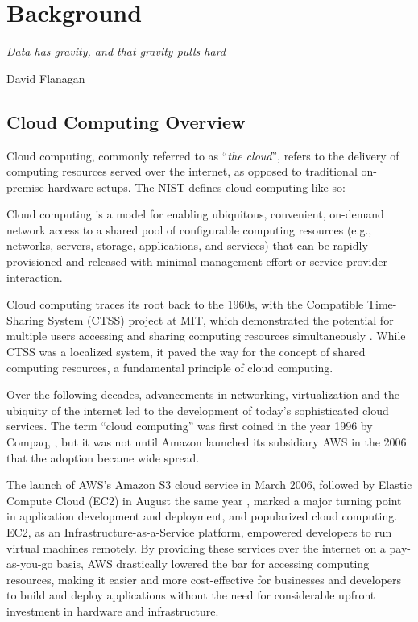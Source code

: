 \documentclass[
  table]{report}
\begin{document}
\newpage

\chapter{Background}
\label{chap:background}

\epigraph{\itshape 
Data has gravity, and that gravity pulls hard
}{David Flanagan}

\section{Cloud Computing Overview}
\label{sect:cloud-overview}

Cloud computing, commonly referred to as ``\emph{the cloud}'', refers to
the delivery of computing resources served over the internet, as opposed
to traditional on-premise hardware setups. The \ac{NIST} defines cloud
computing like so:

\begin{tcolorbox}[
  definitionstyle,
  title=NIST definition of Cloud Computing,
]
Cloud computing is a model for enabling ubiquitous, convenient, on-demand
network access to a shared pool of configurable computing resources (e.g.,
networks, servers, storage, applications, and services) that can be rapidly
provisioned and released with minimal management effort or service provider
interaction. \\

\hfill \citep{nist-def}

\end{tcolorbox}

Cloud computing traces its root back to the 1960s, with the Compatible
Time-Sharing System (CTSS) project at MIT, which demonstrated the
potential for multiple users accessing and sharing computing resources
simultaneously \citep{crisman1963}. While CTSS was a localized system,
it paved the way for the concept of shared computing resources, a
fundamental principle of cloud computing.

Over the following decades, advancements in networking, virtualization
and the ubiquity of the internet led to the development of today's
sophisticated cloud services. The term ``cloud computing'' was first
coined in the year 1996 by Compaq,
\citep{favaloroInternetSolutionsDivision1996}, but it was not until
Amazon launched its subsidiary \ac{AWS} in the 2006 that the adoption
became wide spread.

The launch of AWS's Amazon S3 cloud service in March 2006, followed by
Elastic Compute Cloud (EC2) in August the same year
\citep{barrAmazonEC2Beta2006}, marked a major turning point in
application development and deployment, and popularized cloud computing.
EC2, as an Infrastructure-as-a-Service platform, empowered developers to
run virtual machines remotely. By providing these services over the
internet on a pay-as-you-go basis, AWS drastically lowered the bar for
accessing computing resources, making it easier and more cost-effective
for businesses and developers to build and deploy applications without
the need for considerable upfront investment in hardware and
infrastructure.
\end{document}
